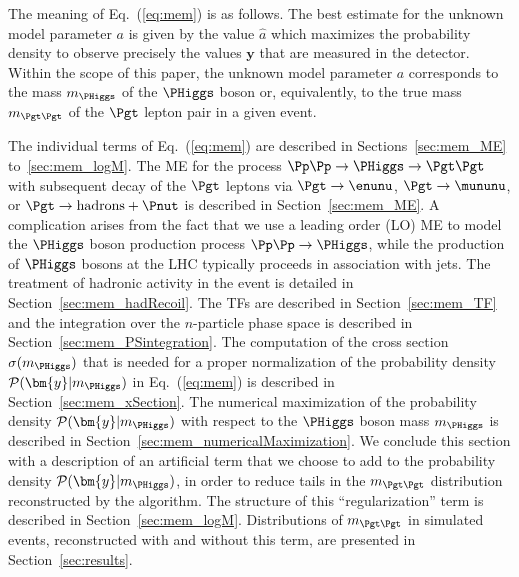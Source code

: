 The meaning of Eq.~(\ref{eq:mem}) is as follows.
The best estimate for the unknown model parameter $a$ is given by the
value $\hat{a}$ which maximizes the probability density to observe precisely the 
values $\bm{y}$ that are measured in the detector. 
Within the scope of this paper, the unknown model parameter $a$
corresponds to the mass $m_{\PHiggs}$ of the $\PHiggs$ boson or,
equivalently, to the true mass $m_{\Pgt\Pgt}$ of the $\Pgt$ lepton
pair in a given event.

The individual terms of Eq.~(\ref{eq:mem}) are described in
Sections~\ref{sec:mem_ME} to~\ref{sec:mem_logM}.
The ME for the process $\Pp\Pp \to \PHiggs \to \Pgt\Pgt$
with subsequent decay of the $\Pgt$ leptons 
via $\Pgt \to \enunu$, $\Pgt \to \mununu$, or $\Pgt \to \textrm{hadrons} + \Pnut$
is described in Section~\ref{sec:mem_ME}.
A complication arises from the fact that we use a leading order (LO)
ME to model the $\PHiggs$ boson production process $\Pp\Pp \to
\PHiggs$, while the production of $\PHiggs$ bosons at the LHC typically
proceeds in association with jets.
The treatment of hadronic activity in the event is detailed in Section~\ref{sec:mem_hadRecoil}.
The TFs are described in Section~\ref{sec:mem_TF} and
the integration over the $n$-particle phase space is described in
Section~\ref{sec:mem_PSintegration}.
The computation of the cross section $\sigma(m_{\PHiggs})$ that is needed for a proper normalization of the probability density $\mathcal{P}(\bm{y}|m_{\PHiggs})$
in Eq.~(\ref{eq:mem}) is described in Section~\ref{sec:mem_xSection}.
The numerical maximization of the probability density $\mathcal{P}(\bm{y}|m_{\PHiggs})$
with respect to the $\PHiggs$ boson mass $m_{\PHiggs}$ is described in
Section~\ref{sec:mem_numericalMaximization}.
We conclude this section with a description of an artificial term that we
choose to add to the probability density $\mathcal{P}(\bm{y}|m_{\PHiggs})$, in
order to reduce tails in the $m_{\Pgt\Pgt}$ distribution reconstructed
by the algorithm. The structure of this ``regularization'' term is described in
Section~\ref{sec:mem_logM}.
Distributions of $m_{\Pgt\Pgt}$ in simulated events,
reconstructed with and without this term, are presented in Section~\ref{sec:results}.



